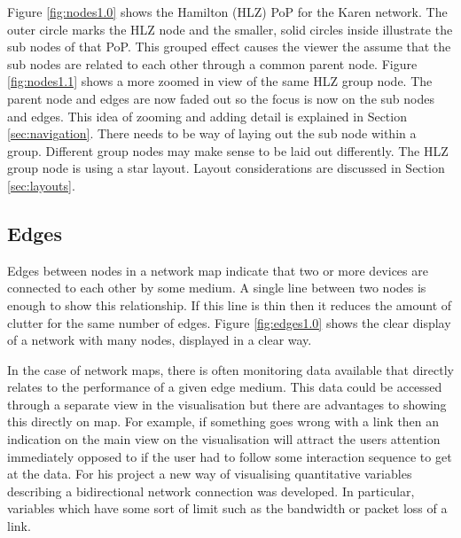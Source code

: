 \documentclass[11pt, a4paper]{article}
\begin{document}
Figure \ref{fig:nodes1.0} shows the Hamilton (HLZ) PoP for the Karen network.
The outer circle marks the HLZ node and the smaller, solid circles inside
illustrate the sub nodes of that PoP. This grouped effect causes the viewer the
assume that the sub nodes are related to each other through a common parent
node. Figure \ref{fig:nodes1.1} shows a more zoomed in view of the same HLZ
group node. The parent node and edges are now faded out so the focus is now on
the sub nodes and edges. This idea of zooming and adding detail is explained in
Section \ref{sec:navigation}. There needs to be way of laying out the sub node
within a group. Different group nodes may make sense to be laid out differently.
The HLZ group node is using a star layout. Layout considerations are discussed
in Section \ref{sec:layouts}.

 

\subsection{Edges}
\label{sec:edges}

Edges between nodes in a network map indicate that two or more devices are
connected to each other by some medium. A single line between two nodes is
enough to show this relationship. If this line is thin then it reduces the
amount of clutter for the same number of edges.\cite{Tufte_2001} Figure
\ref{fig:edges1.0} shows the clear display of a network with many nodes,
displayed in a clear way.

In the case of network maps, there is often monitoring data available that
directly relates to the performance of a given edge medium. This data could be
accessed through a separate view in the visualisation but there are advantages
to showing this directly on map. For example, if something goes wrong with a
link then an indication on the main view on the visualisation will attract the
users attention immediately opposed to if the user had to follow some
interaction sequence to get at the data. For his project a new way of
visualising quantitative variables describing a bidirectional network connection
was developed. In particular, variables which have some sort of limit such as
the bandwidth or packet loss of a link.
\end{document}
